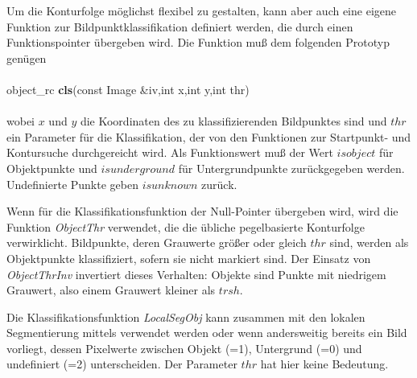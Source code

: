 {Um die Konturfolge möglichst flexibel zu gestalten, kann aber auch eine 
eigene Funktion zur Bildpunktklassifikation definiert werden, die
durch einen Funktionspointer übergeben wird. Die Funktion muß dem 
folgenden Prototyp genügen\\
\\
object\_rc {\bf cls}(const Image \&iv,int x,int y,int thr)\\
\\
wobei $x$ und $y$ die Koordinaten des zu klassifizierenden Bildpunktes sind
und $thr$ ein Parameter für die Klassifikation, der von den Funktionen zur
Startpunkt- und Kontursuche durchgereicht wird. Als Funktionswert muß der 
Wert $isobject$ für Objektpunkte und $isunderground$  für 
Untergrundpunkte zurückgegeben werden. Undefinierte Punkte 
geben $isunknown$ zurück.

Wenn für die Klassifikationsfunktion der Null-Pointer übergeben wird, 
wird die Funktion {\em ObjectThr} verwendet, die die übliche pegelbasierte
Konturfolge verwirklicht. Bildpunkte, deren Grauwerte größer oder gleich 
$thr$ sind, werden als Objektpunkte klassifiziert, sofern sie nicht 
markiert sind. Der Einsatz von {\em ObjectThrInv}
invertiert dieses Verhalten: Objekte sind Punkte mit niedrigem Grauwert, also
einem Grauwert kleiner als $trsh$.

Die Klassifikationsfunktion {\em LocalSegObj} kann zusammen mit den lokalen
Segmentierung mittels  verwendet werden oder wenn andersweitig
bereits ein Bild vorliegt, dessen Pixelwerte zwischen Objekt (=1), Untergrund
(=0) und undefiniert (=2) unterscheiden. Der Parameter $thr$ hat hier keine
Bedeutung. 



}
